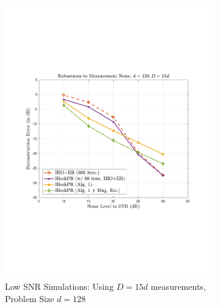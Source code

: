 \begin{figure}[hbtp]
\begin{subfigure}[b]{0.510\textwidth}
\includegraphics[clip=true, trim = 0.75in 2.75in 1in 2.5in,scale=0.45]{pics/robustness_600c}
\caption{Low SNR Simulations: Using $D=15d$ measurements, Problem Size $d=128$}
\label{fig:lowsnr_128}
\end{subfigure}
\hfill
\begin{subfigure}[b]{0.480\textwidth}
\centering

\end{subfigure}
\end{figure}
